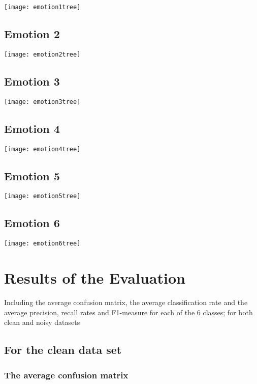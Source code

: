 \documentclass[a4paper,11pt]{article}
\begin{document}
\texttt{[image: emotion1tree]}

\subsection{Emotion 2}

\texttt{[image: emotion2tree]}

\subsection{Emotion 3}

\texttt{[image: emotion3tree]}

\subsection{Emotion 4}

\texttt{[image: emotion4tree]}

\subsection{Emotion 5}

\texttt{[image: emotion5tree]}

\subsection{Emotion 6}

\texttt{[image: emotion6tree]}

\section{Results of the Evaluation}

Including the average confusion matrix, the average classification rate and the average precision, recall rates and F1-measure for each of the 6 classes; for both clean and noisy datasets

\subsection{For the clean data set}

\subsubsection{The average confusion matrix}
\end{document}
